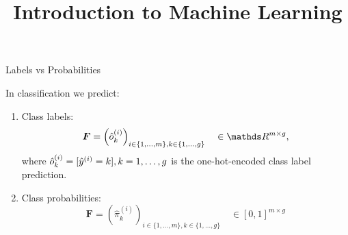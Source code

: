 \documentclass[11pt,compress,t,notes=noshow, xcolor=table]{beamer}
\title{Introduction to Machine Learning}
\institute{\href{https://compstat-lmu.github.io/lecture_i2ml/}{compstat-lmu.github.io/lecture\_i2ml}}
\date{}
\begin{document}
\sloppy


\begin{vbframe}{Labels vs Probabilities}

\footnotesize

In classification we predict:

\begin{enumerate}
  \item Class labels: \\
  $$\bm{F} = \left( \hat{o}_k^{(i)} \right)_{i \in \{1, \dots, m\}, 
  k \in \{1, \dots, g\}}
  \quad \in \R^{m \times g},$$
  where $\hat{o}_k^{(i)} = [\hat{y}^{(i)} = k], k = 1, \dots, g$ is the one-hot-encoded 
  class label prediction.
  \item Class probabilities: \\
  $$\bm{F} = \left(\hat{\pi}_k^{(i)} \right)_{i \in \{1, \dots, m\}, 
  k \in \{1, \dots, g\}}
  \quad \in [0, 1]^{m \times g}$$
\end{enumerate}

\vfill


\end{vbframe}
\end{document}
